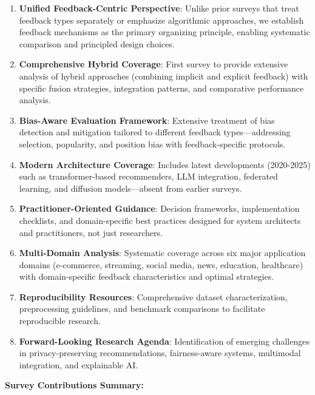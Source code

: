 \begin{enumerate}
    \item \textbf{Unified Feedback-Centric Perspective}: Unlike prior surveys that treat feedback types separately or emphasize algorithmic approaches, we establish feedback mechanisms as the primary organizing principle, enabling systematic comparison and principled design choices.
    
    \item \textbf{Comprehensive Hybrid Coverage}: First survey to provide extensive analysis of hybrid approaches (combining implicit and explicit feedback) with specific fusion strategies, integration patterns, and comparative performance analysis.
    
    \item \textbf{Bias-Aware Evaluation Framework}: Extensive treatment of bias detection and mitigation tailored to different feedback types—addressing selection, popularity, and position bias with feedback-specific protocols.
    
    \item \textbf{Modern Architecture Coverage}: Includes latest developments (2020-2025) such as transformer-based recommenders, LLM integration, federated learning, and diffusion models—absent from earlier surveys.
    
    \item \textbf{Practitioner-Oriented Guidance}: Decision frameworks, implementation checklists, and domain-specific best practices designed for system architects and practitioners, not just researchers.
    
    \item \textbf{Multi-Domain Analysis}: Systematic coverage across six major application domains (e-commerce, streaming, social media, news, education, healthcare) with domain-specific feedback characteristics and optimal strategies.
    
    \item \textbf{Reproducibility Resources}: Comprehensive dataset characterization, preprocessing guidelines, and benchmark comparisons to facilitate reproducible research.
    
    \item \textbf{Forward-Looking Research Agenda}: Identification of emerging challenges in privacy-preserving recommendations, fairness-aware systems, multimodal integration, and explainable AI.
\end{enumerate}

\textbf{Survey Contributions Summary:}

